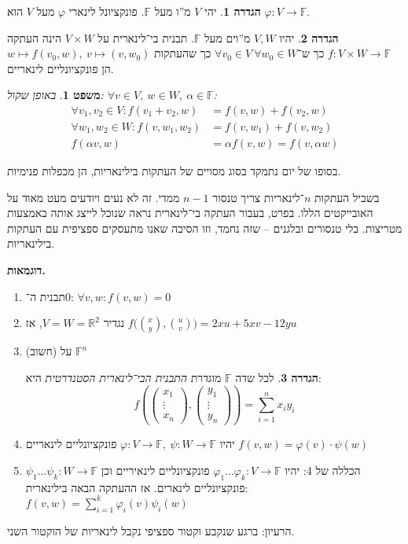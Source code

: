 \documentclass[]{article}
\newcommand\R     {\mathbb{R}}
\newcommand\vphi  {\varphi}
\newcommand\F         {\mathbb{F}}
\newcommand\co        {\colon}
\newcommand\pms[1]    {\begin{pmatrix}
        #1
\end{pmatrix}}
\newcommand\ag        {\alpha}
\newcommand\cl [1]    {\left ( #1 \right )}
\renewcommand\phi     {\varphi}
\newtheorem{Theorem}{משפט}
\theoremstyle{definition}
\newtheorem{definition}{הגדרה}
\newcommand\theo  [1] {\begin{Theorem}#1\end{Theorem}}
\newcommand\defi  [1] {\begin{definition}#1\end{definition}}
\begin{document}
    \defi{יהי $V$ מ''ו מעל $\F$. פונקציונל לינארי $\vphi$ מעל $V$ הוא $\vphi \co V \to \F$. }
    \defi{יהיו $V, W$ מ''וים מעל $\F$. תבנית בי־לינארית על $V \times W$ הינה העתקה $f \co V \times W \to \F$ כך ש־$\forall v_0 \in V \ \forall w_0 \in W$ כך שהעתקות $w \mapsto f(v_0, w), \ v \mapsto (v, w_0)$ הן פונקציונליים לינאריים. }
    \theo{באופן שקול: \hfill $\forall v \in V, \ w \in W, \ \ag \in \F$: 
        \[ \begin{aligned}
            \forall v_1, v_2 \in V \co f(v_1 + v_2, w) &= f(v, w) + f(v_2, w) \\
            \forall w_1, w_2 \in W \co f(v, w_1, w_2) &= f(v, w_1) + f(v, w_2) \\
            f(\ag v, w) &= \ag f(v, w) = f(v, \ag w)
        \end{aligned} \]}
    
    בסופו של יום נתמקד בסוג מסויים של העתקות בילינאריות, הן מכפלות פנימיות. 
    
    בשביל העתקות $n$־לינאריות צריך טנסור $n - 1$ ממדי. זה לא נעים ויודעים מעט מאוד על האובייקטים הללו. בפרט, בעבור העתקה בי־לינארית נראה שנוכל לייצג אותה באמצעות מטריצות. בלי טנסורים ובלגנים – שזה נחמד, וזו הסיבה שאנו מתעסקים ספציפית עם העתקות בילינאריות. 
    
    \textbf{דוגמאות. }
    \begin{enumerate}
        \item תבנית ה־$0$: \hfill $\forall v,w \co f(v, w) = 0$ 
        \item נגדיר $V = W = \R^2$, אז \hfill $f\big(\binom{x}{y}, \binom{u}{v}\big) = 2xu + 5xv - 12yu$
        \item (חשוב)  על $\F^n$ \defi{לכל שדה $\F$ מוגדרת \textit{התבנית הבי־לינארית הסטנדרטית} היא: 
        \[ f\cl{\pms{x_1 \\ \vdots \\ x_n}, \pms{y_1 \\ \vdots \\ y_n}} = \sum_{i = 1}^{n}x_iy_i \]}
        \item יהיו $\phi \co V \to \F, \ \psi \co W \to \F$ פונקציונליים לינאריים \hfill $f(v, w) = \phi(v) \cdot \psi(w)$
        \item הכללה של 4: יהיו $\phi_1 \dots \phi_k \co V \to \F$ פונקציונליים לינאיריים וכן $\psi_1 \dots \psi_k \co W \to \F$ פונקציונליים לינארים. אז ההעתקה הבאה בילינארית: \hfill $f(v, w) = \sum_{i = 1}^{k}\phi_i(v) \psi_i(w)$
    \end{enumerate}
    הרעיון: ברגע שנקבע וקטור ספציפי נקבל לינאריות של הוקטור השני. 
    
\end{document}
